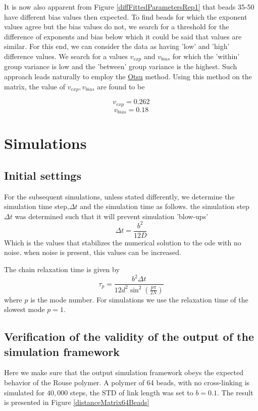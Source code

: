\documentclass[12pt]{book}
\begin{document}
It is now also apparent from Figure \ref{diffFittedParametersRep1} that beads 35-50 have different bias values then expected. To find beads for which the exponent values agree but the bias values do not, we search for a threshold for the difference of exponents and bias below which it could be said that values are similar. 
For this end, we can consider the data as having 'low' and 'high' difference values. 
We search for a values $v_{exp}$ and $v_{bias}$ for which the 'within' group variance is low and the 'between' group variance is the highest. 
Such approach leads naturally to employ the \href{http://en.wikipedia.org/wiki/Otsu's_method}{Otsu} method. Using this method on the matrix, the value of $v_{exp},v_{bias}$ are found to be 

\begin{equation}
v_{exp}= 0.262
\end{equation}
\begin{equation}
v_{bias}=0.18
\end{equation}

\section{Simulations}
\subsection{Initial settings}
For the subsequent simulations, unless stated differently, we determine the simulation time step,$\Delta t$ and the simulation time as follows. 
the simulation step $\Delta t$  was determined such that it will prevent simulation 'blow-ups'
\begin{equation*}
 \Delta t = \frac{b^2}{12D}
\end{equation*}
Which is the values that stabilizes the numerical solution to the ode with no noise. when noise is present, this values can be increased.

The chain relaxation time is given by 
\begin{equation*}
\tau_p = \frac{b^2\Delta t}{12d^2\sin^2(\frac{p\pi}{2N})}
\end{equation*}
where $p$ is the mode number. For simulations we use the relaxation time of the slowest mode $p=1$.

\subsection{Verification of the validity of the output of the simulation framework}
Here we make sure that the output simulation framework obeys the expected behavior of the Rouse polymer. 
A polymer of 64 beads, with no cross-linking is simulated for $40,000$ steps, the STD of link length was set to $b=0.1$. The result is presented in Figure \ref{distanceMatrix64Beads}
\end{document}
